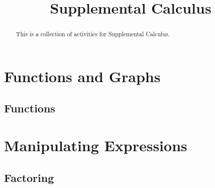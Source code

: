 \documentclass{ximera}
\title{Supplemental Calculus}
\begin{document}
\begin{abstract}
This is a collection of activities for Supplemental Calculus.
\end{abstract}

\maketitle


 \renewcommand{\maketitle}{}

\section{Functions and Graphs}

\subsection{Functions}



\section{Manipulating Expressions}

\subsection{Factoring}



\end{document}
